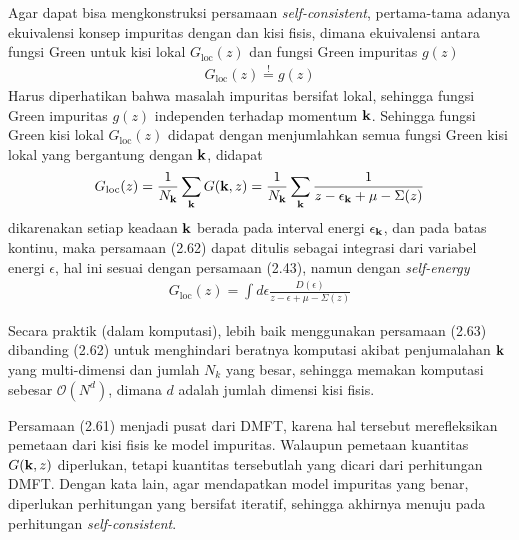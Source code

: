 Agar dapat bisa mengkonstruksi persamaan \textit{self-consistent}, pertama-tama adanya ekuivalensi konsep impuritas dengan dan kisi fisis, dimana ekuivalensi antara fungsi Green untuk kisi lokal $G_{\text{loc}}(z)$ dan fungsi Green impuritas $g(z)$
\begin{align}
G_{\text{loc}}(z) \stackrel{!}{=} g(z)
\end{align}
Harus diperhatikan bahwa masalah impuritas bersifat lokal, sehingga fungsi Green impuritas $g(z)$ independen terhadap momentum $\textbf{k}$. Sehingga fungsi Green kisi lokal $G_{\text{loc}}(z)$ didapat dengan menjumlahkan semua fungsi Green kisi lokal yang bergantung dengan $\textbf{k}$, didapat
\begin{align}
G_{\text{loc}}(z) = \frac{1}{N_{\textbf{k}}} \sum_{\textbf{k}} G(\textbf{k},z) = \frac{1}{N_{\textbf{k}}} \sum_{\textbf{k}} \frac{1}{z - \epsilon_{\textbf{k}} + \mu - \Sigma(z)}
\end{align}
dikarenakan setiap keadaan $\textbf{k}$ berada pada interval energi $\epsilon_{\textbf{k}}$, dan pada batas kontinu, maka persamaan (2.62) dapat ditulis sebagai integrasi dari variabel energi $\epsilon$, hal ini sesuai dengan persamaan (2.43), namun dengan \textit{self-energy}
\begin{align}
G_{\text{loc}}(z) = \int d\epsilon \frac{D(\epsilon)}{z - \epsilon + \mu - \Sigma(z)}
\end{align}

Secara praktik (dalam komputasi), lebih baik menggunakan persamaan (2.63) dibanding (2.62) untuk menghindari beratnya komputasi akibat penjumalahan $\textbf{k}$ yang multi-dimensi dan jumlah $N_k$ yang besar, sehingga memakan komputasi sebesar $\mathcal{O}(N^d)$, dimana $d$ adalah jumlah dimensi kisi fisis.

Persamaan (2.61) menjadi pusat dari DMFT, karena hal tersebut merefleksikan pemetaan dari kisi fisis ke model impuritas. Walaupun pemetaan kuantitas $G(\textbf{k},z)$ diperlukan, tetapi kuantitas tersebutlah yang dicari dari perhitungan DMFT. Dengan kata lain, agar mendapatkan model impuritas yang benar, diperlukan perhitungan yang bersifat iteratif, sehingga akhirnya menuju pada perhitungan \textit{self-consistent}.

